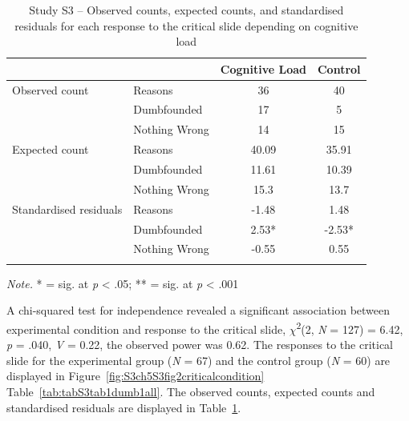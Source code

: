 \documentclass[
  american,
  man,floatsintext]{apa7}
\begin{document}
\begin{table}[tbp]

\begin{center}
\begin{threeparttable}

\caption{\label{tab:S3S3tab1dumb}Study S3 – Observed counts, expected counts, and standardised residuals for each response to the critical slide depending on cognitive load}

\begin{tabular}{llcc}
\toprule
 & \multicolumn{1}{c}{} & \multicolumn{1}{c}{Cognitive Load} & \multicolumn{1}{c}{Control}\\
\midrule
Observed count & Reasons & 36 & 40\\
 & Dumbfounded & 17 & 5\\
 & Nothing Wrong & 14 & 15\\
Expected count & Reasons & 40.09 & 35.91\\
 & Dumbfounded & 11.61 & 10.39\\
 & Nothing Wrong & 15.3 & 13.7\\
Standardised residuals & Reasons & -1.48 & 1.48\\
 & Dumbfounded & 2.53* & -2.53*\\
 & Nothing Wrong & -0.55 & 0.55\\
\bottomrule
\addlinespace
\end{tabular}

\begin{tablenotes}[para]
\normalsize{\textit{Note.} * = sig. at \emph{p} < .05; ** = sig. at \emph{p} < .001}
\end{tablenotes}

\end{threeparttable}
\end{center}

\end{table}

A chi-squared test for independence revealed a significant association between experimental condition and response to the critical slide, \(\chi\)\textsuperscript{2}(2, \emph{N} = 127) = 6.42, \emph{p} = .040, \emph{V} = 0.22, the observed power was 0.62. The responses to the critical slide for the experimental group (\emph{N} = 67) and the control group (\emph{N} = 60) are displayed in Figure~\ref{fig:S3ch5S3fig2criticalcondition} Table~\ref{tab:tabS3tab1dumb1all}. The observed counts, expected counts and standardised residuals are displayed in Table~\ref{tab:S3S3tab1dumb}.
\end{document}
